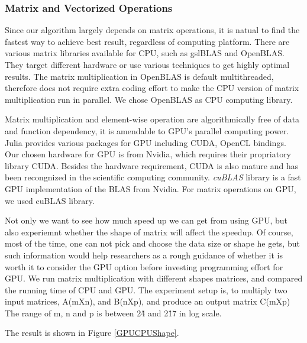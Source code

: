 \documentclass[9pt,twocolumn,twoside,lineno]{gsag3jnl}
\begin{document}
 
\subsubsection{Matrix and Vectorized Operations}

Since our algorithm largely depends on matrix operations, it is natual to find the fastest way to achieve best result, regardless of computing platform. 
There are various matrix libraries available for CPU, such as gslBLAS and OpenBLAS. 
They target different hardware or use various techniques to get highly optimal results. 
The matrix multiplication in OpenBLAS is default multithreaded, therefore does not require extra coding effort to make the CPU version of matrix multiplication run in parallel.
We chose OpenBLAS as CPU computing library.  

Matrix multiplication and element-wise operation are algorithmically free of data and function dependency, it is amendable to GPU's parallel computing power.
Julia provides various packages for GPU including CUDA, OpenCL bindings. 
Our chosen hardware for GPU is from Nvidia, which requires their propriatory library CUDA. 
Besides the hardware requirement, CUDA is also mature and has been recongnized in the scientific computing community. 
\textit{cuBLAS} library is a fast GPU implementation of the BLAS from Nvidia. 
For matrix operations on GPU, we used cuBLAS library. 

Not only we want to see how much speed up we can get from using GPU, but also experiemnt whether the shape of matrix will affect the speedup. 
Of course, most of the time, one can not pick and choose the data size or shape he gets, 
but such information would help researchers as a rough guidance of whether it is worth it to consider the GPU option before investing programming effort for GPU. 
We run matrix multiplication with different shapes matrices, and compared the running time of CPU and GPU. 
The experiment setup is, to multiply two input matrices, A(mXn), and B(nXp), and produce an output matrix C(mXp)
The range of m, n and p is between 2\^4 and 2\^17 in log scale.

The result is shown in Figure \ref{GPUCPUShape}.
\end{document}
